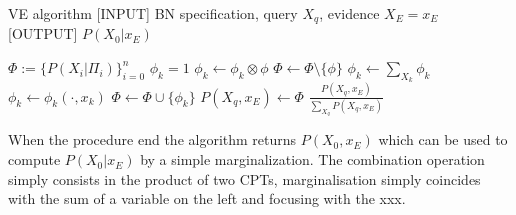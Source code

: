 \begin{algorithm}
\caption{VE algorithm
\vskip 0.6mm [INPUT] BN specification, query $X_q$, evidence $X_E=x_E$ \vskip 0.6mm [OUTPUT] $P(X_0|x_E)$
\label{alg:VEBN}}
\begin{algorithmic}[1]
\State $\Phi := \{ P(X_i|\Pi_i) \}_{i=0}^n$
\State $\phi_k =1$ 
\For{$\phi \in \Phi$}
\State $\phi_k \gets \phi_k \otimes \phi$
\State $\Phi \gets \Phi \setminus \{ \phi \}$
\EndIf
\EndFor
{}
\State $\phi_k \gets \sum_{X_k} \phi_k$
\EndIf
{}
\State $\phi_k \gets \phi_k(\cdot,x_k)$
\EndIf
\State $\Phi \gets \Phi \cup \{ \phi_k \}$
\EndFor
\State $P(X_q,x_E) \gets \Phi$ 
 $\frac{P(X_q,x_E)}{\sum_{X_q} P(X_q,x_E)}$

	\end{algorithmic}
\end{algorithm}



When the procedure end the algorithm returns $P(X_0,x_E)$ which can be used to compute $P(X_0|x_E)$ by a simple marginalization. The combination operation simply consists in the product of two CPTs, marginalisation simply coincides with the sum of a variable on the left and focusing with the xxx.
